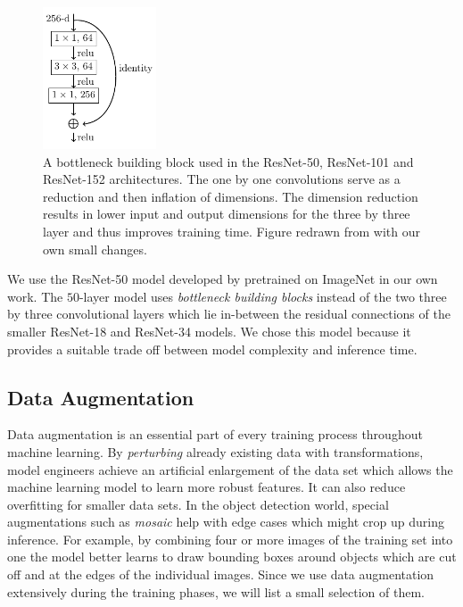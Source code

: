 \documentclass[draft,final]{vutinfth} %
\begin{document}
\begin{figure}
  \centering
  \includegraphics[width=0.3\textwidth]{graphics/bottleneck/bottleneck.pdf}
  \caption[Bottleneck building block]{A bottleneck building block used
    in the ResNet-50, ResNet-101 and ResNet-152 architectures. The one
    by one convolutions serve as a reduction and then inflation of
    dimensions. The dimension reduction results in lower input and
    output dimensions for the three by three layer and thus improves
    training time. Figure redrawn from \textcite{he2016} with our own
    small changes.}
  \label{fig:residual-connection}
\end{figure}

We use the ResNet-50 model developed by \textcite{he2016} pretrained
on ImageNet in our own work. The $50$-layer model uses
\emph{bottleneck building blocks} instead of the two three by three
convolutional layers which lie in-between the residual connections of
the smaller ResNet-18 and ResNet-34 models. We chose this model
because it provides a suitable trade off between model complexity and
inference time.

\subsection{Data Augmentation}
\label{sec:methods-augmentation}

Data augmentation is an essential part of every training process
throughout machine learning. By \emph{perturbing} already existing
data with transformations, model engineers achieve an artificial
enlargement of the data set which allows the machine learning model to
learn more robust features. It can also reduce overfitting for smaller
data sets. In the object detection world, special augmentations such
as \emph{mosaic} help with edge cases which might crop up during
inference. For example, by combining four or more images of the
training set into one the model better learns to draw bounding boxes
around objects which are cut off and at the edges of the individual
images. Since we use data augmentation extensively during the training
phases, we will list a small selection of them.
\end{document}
